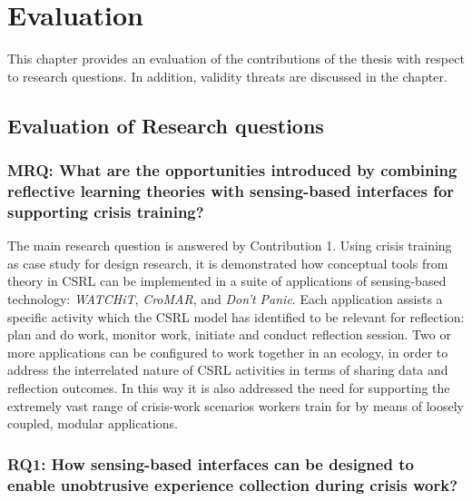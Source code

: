 \chapter{Evaluation}\label{evaluation}


This chapter provides an evaluation of the contributions of the thesis with respect to research questions. In addition, validity threats are discussed in the chapter.

\section{Evaluation of Research questions}\label{evaluation-of-research-questions}

\subsection{MRQ: What are the opportunities introduced by combining reflective learning theories with sensing-based interfaces for supporting crisis training?}\label{mrq-what-are-the-opportunities-introduced-by-combining-reflective-learning-theories-with-sensing-based-interfaces-for-supporting-crisis-training}

The main research question is answered by Contribution 1. Using crisis training as case study for design research, it is demonstrated how conceptual tools from theory in CSRL can be implemented in a suite of applications of sensing-based technology: \emph{WATCHiT}, \emph{CroMAR}, and \emph{Don't Panic}. Each application assists a specific activity which the CSRL model has identified to be relevant for reflection: plan and do work, monitor work, initiate and conduct reflection session. Two or more applications can be configured to work together in an ecology, in order to address the interrelated nature of CSRL activities in terms of sharing data and reflection outcomes. In this way it is also addressed the need for supporting the extremely vast range of crisis-work scenarios workers train for by means of loosely coupled, modular applications.

\subsection{RQ1: How sensing-based interfaces can be designed to enable unobtrusive experience collection during crisis work?}\label{rq1-how-sensing-based-interfaces-can-be-designed-to-enable-unobtrusive-experience-collection-during-crisis-work}

